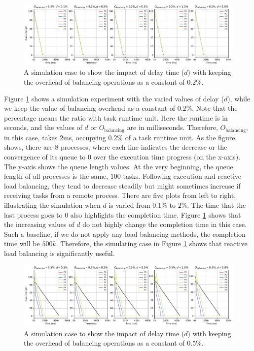 \begin{figure}[t]
  \centering
  \includegraphics[scale=0.45]{./pictures/perf_analysis_model/perf_model_queue_decrease_delay_impact_OB2.pdf}
	\caption{A simulation case to show the impact of delay time ($d$) with keeping the overhead of balancing operations as a constant of $0.2\%$.}
	\label{fig:react_lb_sim_delay_impact_Obal_2}
\end{figure}

Figure \ref{fig:react_lb_sim_delay_impact_Obal_2} shows a simulation experiment with the varied values of delay ($d$), while we keep the value of balancing overhead as a constant of $0.2\%$. Note that the percentage means the ratio with task runtime unit. Here the runtime is in seconds, and the values of $d$ or $O_{\text{balancing}}$ are in milliseconds. Therefore, $O_{\text{balancing}}$, in this case, takes $2$ms, occupying $0.2\%$ of a task runtime unit. As the figure shows, there are $8$ processes, where each line indicates the decrease or the convergence of its queue to $0$ over the execution time progress (on the x-axis). The y-axis shows the queue length values. At the very beginning, the queue length of all processes is the same, $100$ tasks. Following execution and reactive load balancing, they tend to decrease steadily but might sometimes increase if receiving tasks from a remote process. There are five plots from left to right, illustrating the simulation when $d$ is varied from $0.1\%$ to $2\%$. The time that the last process goes to $0$ also highlights the completion time. Figure \ref{fig:react_lb_sim_delay_impact_Obal_2} shows that the increasing values of $d$ do not highly change the completion time in this case. Such a baseline, if we do not apply any load balancing methods, the completion time will be $500k$. Therefore, the simulating case in Figure \ref{fig:react_lb_sim_delay_impact_Obal_2} shows that reactive load balancing is significantly useful.\\

\begin{figure}[t]
  \centering
  \includegraphics[scale=0.45]{./pictures/perf_analysis_model/perf_model_queue_decrease_delay_impact_OB5.pdf}
	\caption{A simulation case to show the impact of delay time ($d$) with keeping the overhead of balancing operations as a constant of $0.5\%$.}
	\label{fig:react_lb_sim_delay_impact_Obal_5}
\end{figure}

